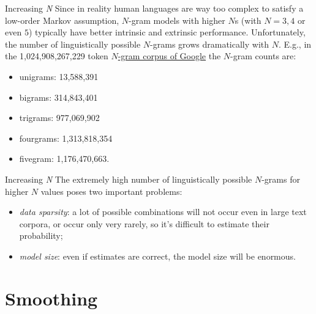 \documentclass[style=upen, size=14pt]{powerdot}
\theoremstyle{definition}
\begin{document}
\begin{slide}[toc=Increasing \emph{N}]{Increasing \emph{N}}
  Since in reality human languages are way too complex to satisfy a low-order
  Markov assumption, $N$-gram models with higher $N$s (with $N=3,4$ or even $5$)
  typically have better intrinsic and extrinsic performance.
  Unfortunately, the number of linguistically possible $N$-grams grows
  dramatically with $N$. E.g., in the 1,024,908,267,229 token
  \href{https://catalog.ldc.upenn.edu/LDC2006T13}{$N$-gram corpus of Google} the
  $N$-gram counts are:
  \begin{itemize}
  \item unigrams: 13,588,391
  \item bigrams: 314,843,401
  \item trigrams: 977,069,902
  \item fourgrams: 1,313,818,354
  \item fivegram: 1,176,470,663.
  \end{itemize}
\end{slide}

\begin{slide}[toc=]{Increasing \emph{N}}
  The extremely high number of linguistically possible $N$-grams for higher $N$
  values poses two important problems:
  \begin{itemize}
  \item \emph{data sparsity}: a lot of possible combinations will not occur even
    in large text corpora, or occur only very rarely, so it's difficult to
    estimate their probability;
  \item \emph{model size}: even if estimates are correct, the model size will be
    enormous.
  \end{itemize}
\end{slide}

\section{Smoothing}
\end{document}

